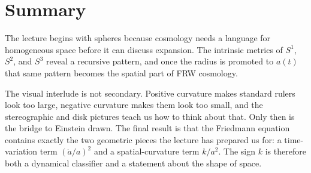 \section{Summary}

The lecture begins with spheres because cosmology needs a language for homogeneous space before it can discuss expansion. The intrinsic metrics of \(S^1\), \(S^2\), and \(S^3\) reveal a recursive pattern, and once the radius is promoted to \(a(t)\) that same pattern becomes the spatial part of FRW cosmology.

The visual interlude is not secondary. Positive curvature makes standard rulers look too large, negative curvature makes them look too small, and the stereographic and disk pictures teach us how to think about that. Only then is the bridge to Einstein drawn. The final result is that the Friedmann equation contains exactly the two geometric pieces the lecture has prepared us for: a time-variation term \((\dot a/a)^2\) and a spatial-curvature term \(k/a^2\). The sign \(k\) is therefore both a dynamical classifier and a statement about the shape of space.
